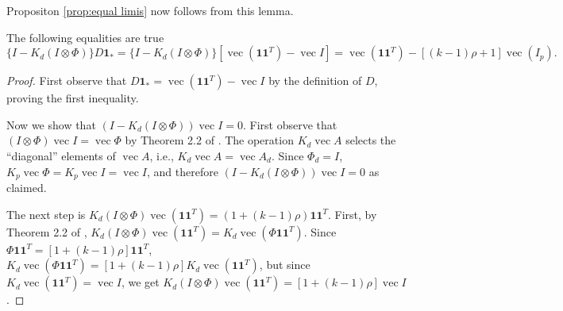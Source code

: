 \documentclass[twoside]{article}
\DeclareMathOperator{\vvec}{vec}
\begin{document}
Propositon \ref{prop:equal limis} now follows from this lemma.
\begin{lem}
The following equalities are true
\begin{equation*}
 \{I-K_{d}(I\otimes \Phi)\}D\boldsymbol{1}_{*}
= \{I-K_{d}(I\otimes \Phi)\}[\vvec(\boldsymbol{1}\boldsymbol{1}^{T})-\vvec I]
= \vvec(\boldsymbol{1}\boldsymbol{1}^{T})-[(k-1)\rho+1]\vvec(I_{p}).
\end{equation*}
\end{lem}

\begin{proof}
First observe that $D\boldsymbol{1}_{*}=\vvec(\boldsymbol{1}\boldsymbol{1}^{T})-\vvec I$
by the definition of $D$, proving the first inequality. 

Now we show that $(I-K_{d}(I\otimes \Phi))\vvec I=0$. First observe
that $(I\otimes \Phi)\vvec I=\vvec\Phi$ by Theorem 2.2 of \citet{Magnus2019-cz}.
The operation $K_{d}\vvec A$ selects the ``diagonal'' elements
of $\vvec A$, i.e., $K_{d}\vvec A=\vvec A_{d}$. Since $\Phi_{d}=I$,
$K_{p}\vvec\Phi=K_{p}\vvec I=\vvec I$, and therefore $(I-K_{d}(I\otimes\Phi))\vvec I=0$
as claimed.

The next step is $K_{d}(I\otimes \Phi)\vvec(\boldsymbol{1}\boldsymbol{1}^{T})=(1+(k-1)\rho)\boldsymbol{1}\boldsymbol{1}^{T}$.
First, by Theorem 2.2 of \citet{Magnus2019-cz}, $K_{d}(I\otimes\Phi)\vvec(\boldsymbol{1}\boldsymbol{1}^{T})=K_{d}\vvec(\Phi\boldsymbol{1}\boldsymbol{1}^{T})$.
Since $\Phi\boldsymbol{1}\boldsymbol{1}^{T}=[1+(k-1)\rho]\boldsymbol{1}\boldsymbol{1}^{T}$,
$K_{d}\vvec(\Phi\boldsymbol{1}\boldsymbol{1}^{T})=[1+(k-1)\rho]K_{d}\vvec(\boldsymbol{1}\boldsymbol{1}^{T})$,
but since $K_{d}\vvec(\boldsymbol{1}\boldsymbol{1}^{T})=\vvec I$, we get
$K_{d}(I\otimes\Phi)\vvec(\boldsymbol{1}\boldsymbol{1}^{T})=[1+(k-1)\rho]\vvec I$.
\end{proof}


\end{document}
